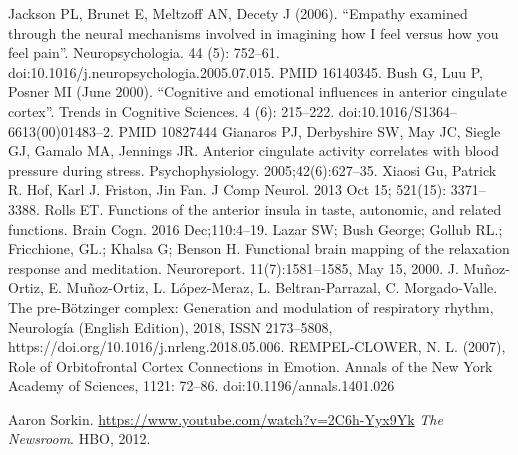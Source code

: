 \documentclass{article}
\begin{document}
Jackson PL, Brunet E, Meltzoff AN, Decety J (2006). “Empathy examined through the neural mechanisms involved in imagining how I feel versus how you feel pain”. Neuropsychologia. 44 (5): 752–61. doi:10.1016/j.neuropsychologia.2005.07.015. PMID 16140345.
Bush G, Luu P, Posner MI (June 2000). “Cognitive and emotional influences in anterior cingulate cortex”. Trends in Cognitive Sciences. 4 (6): 215–222. doi:10.1016/S1364–6613(00)01483–2. PMID 10827444
Gianaros PJ, Derbyshire SW, May JC, Siegle GJ, Gamalo MA, Jennings JR. Anterior cingulate activity correlates with blood pressure during stress. Psychophysiology. 2005;42(6):627–35.
Xiaosi Gu, Patrick R. Hof, Karl J. Friston, Jin Fan. J Comp Neurol. 2013 Oct 15; 521(15): 3371–3388.
Rolls ET. Functions of the anterior insula in taste, autonomic, and related functions. Brain Cogn. 2016 Dec;110:4–19.
Lazar SW; Bush George; Gollub RL.; Fricchione, GL.; Khalsa G; Benson H. Functional brain mapping of the relaxation response and meditation.
Neuroreport. 11(7):1581–1585, May 15, 2000.
J. Muñoz-Ortiz, E. Muñoz-Ortiz, L. López-Meraz, L. Beltran-Parrazal, C. Morgado-Valle. The pre-Bötzinger complex: Generation and modulation of respiratory rhythm, Neurología (English Edition), 2018, ISSN 2173–5808,
https://doi.org/10.1016/j.nrleng.2018.05.006.
REMPEL‐CLOWER, N. L. (2007), Role of Orbitofrontal Cortex Connections in
Emotion. Annals of the New York Academy of Sciences, 1121:
72–86. doi:10.1196/annals.1401.026


\pagebreak

\begin{thebibliography}{9}
\raggedright

  Aaron Sorkin.
  \url{https://www.youtube.com/watch?v=2C6h-Yyx9Yk}
  \textit{The Newsroom}.
  HBO, 2012.

\end{thebibliography}
\end{document}
